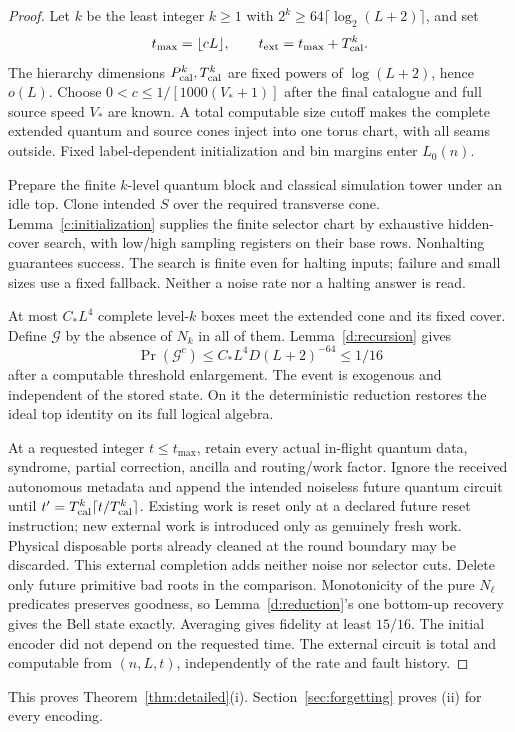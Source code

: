 \begin{proof}
Let \(k\) be the least integer \(k\ge1\) with
\(2^k\ge64\lceil\log_2(L+2)\rceil\), and set
\[
 t_{\max}=\lfloor cL\rfloor,\qquad
 t_{\rm ext}=t_{\max}+T_{\rm cal}^{k}.
\]
The hierarchy dimensions \(P_{\rm cal}^k,T_{\rm cal}^k\) are fixed
powers of \(\log(L+2)\), hence \(o(L)\).
Choose \(0<c\le1/[1000(V_*+1)]\) after the final catalogue and full
source speed \(V_*\) are known. A total computable size cutoff
makes the complete extended quantum and source cones inject into
one torus chart, with all seams outside. Fixed label-dependent
initialization and bin margins enter \(L_0(n)\).

Prepare the finite \(k\)-level quantum block and classical simulation
tower under an idle top. Clone intended \(S\) over the required
transverse cone. Lemma~\ref{c:initialization} supplies the finite
selector chart by exhaustive hidden-cover search, with low/high
sampling registers on their base rows. Nonhalting guarantees success. The search
is finite even for halting inputs; failure and small sizes use a fixed
fallback. Neither a noise rate nor a halting answer is read.

At most \(C_*L^4\) complete level-\(k\) boxes meet the extended
cone and its fixed cover. Define \(\mathcal G\) by the absence of
\(N_k\) in all of them. Lemma~\ref{d:recursion} gives
\[
 \Pr(\mathcal G^c)\le C_*L^4D(L+2)^{-64}\le1/16
\]
after a computable threshold enlargement. The event is exogenous
and independent of the stored state. On it the deterministic
reduction restores the ideal top identity on its full logical algebra.

At a requested integer \(t\le t_{\max}\), retain every actual
in-flight quantum data, syndrome, partial correction, ancilla and
routing/work factor. Ignore the received autonomous metadata and
append the intended noiseless future quantum circuit until
\(t'=T_{\rm cal}^k\lceil t/T_{\rm cal}^k\rceil\).
Existing work is reset only at a declared future reset instruction;
new external work is introduced only as genuinely fresh work.
Physical disposable ports already cleaned at the round boundary may
be discarded. This external completion adds neither noise nor
selector cuts. Delete only future primitive bad roots in the comparison.
Monotonicity of the pure \(N_\ell\) predicates preserves goodness,
so Lemma~\ref{d:reduction}'s one bottom-up recovery gives the Bell
state exactly. Averaging gives fidelity at least \(15/16\).
The initial encoder did not depend on the requested time. The
external circuit is total and computable from \((n,L,t)\), independently
of the rate and fault history.
\end{proof}

This proves Theorem~\ref{thm:detailed}(i). Section~\ref{sec:forgetting} proves (ii) for every encoding.
